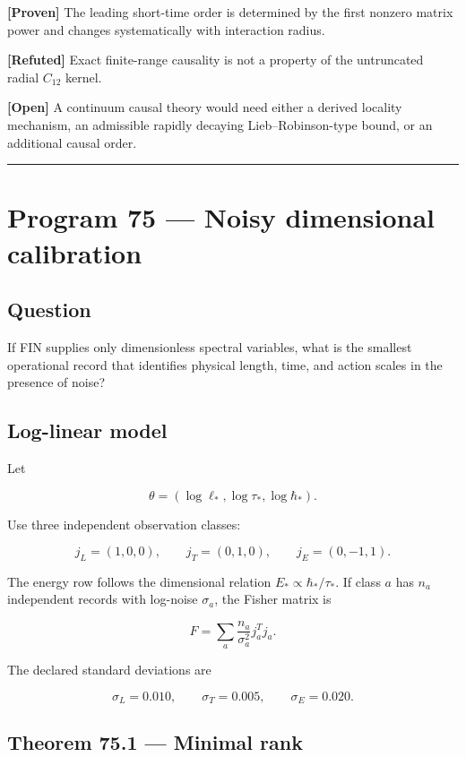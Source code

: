 \documentclass[11pt,a4paper,openany]{report}
\newcommand{\statusProven}{\textcolor{fingreen}{[Proven]}}
\newcommand{\statusRefuted}{\textcolor{finred}{[Refuted]}}
\newcommand{\statusOpen}{\textcolor{finviolet}{[Open]}}
\begin{document}
\textbf{\statusProven{}} The leading short-time order is determined by the first nonzero matrix power and changes systematically with interaction radius.

\textbf{\statusRefuted{}} Exact finite-range causality is not a property of the untruncated radial \(C_{12}\) kernel.

\textbf{\statusOpen{}} A continuum causal theory would need either a derived locality mechanism, an admissible rapidly decaying Lieb--Robinson-type bound, or an additional causal order.

\par\medskip\hrule\medskip

\chapter{Program 75 --- Noisy dimensional calibration}

\section{Question}

If FIN supplies only dimensionless spectral variables, what is the smallest operational record that identifies physical length, time, and action scales in the presence of noise?

\section{Log-linear model}

Let

\[
\theta
=
(\log\ell_*,\log\tau_*,\log\hbar_*).
\]

Use three independent observation classes:

\[
j_L=(1,0,0),
\qquad
j_T=(0,1,0),
\qquad
j_E=(0,-1,1).
\]

The energy row follows the dimensional relation \(E_*\propto\hbar_*/\tau_*\). If class \(a\) has \(n_a\) independent records with log-noise \(\sigma_a\), the Fisher matrix is

\[
F
=
\sum_a\frac{n_a}{\sigma_a^2}j_a^Tj_a.
\]

The declared standard deviations are

\[
\sigma_L=0.010,\qquad
\sigma_T=0.005,\qquad
\sigma_E=0.020.
\]

\section{Theorem 75.1 --- Minimal rank}
\end{document}
